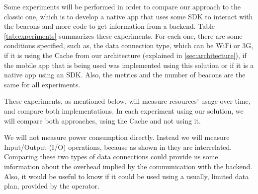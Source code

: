 Some experiments will be performed in order to compare
our approach to the classic one, which is to develop a
native app that uses some SDK to interact with the beacons
and more code to get information from a backend.
Table \ref{tab:experiments} summarizes these experiments.
For each one, there are some conditions specified, such as,
the data connection type, which can be WiFi or 3G, if
it is using the Cache from our architecture (explained in 
\ref{sec:architecture}), if the mobile app that is being
used was implemented using this solution or if it is
a native app using an SDK. 
Also, the metrics and the number of beacons
are the same for all experiments.



These experiments, as mentioned below, 
will measure resources' usage over time, 
and compare both implementations. In each
experiment using our solution, we will
compare both approaches, using the Cache
and not using it.

We will not measure power consumption directly.
Instead we will measure Input/Output (I/O)
operations, because as shown in 
\cite{Pathak2012} they are interrelated.
Comparing these
two types of data connections could provide us
some information about the
overhead implied by the communication with
the backend. Also, it would be useful to
know if it could be used using
a usually, limited data plan, provided by
the operator.

